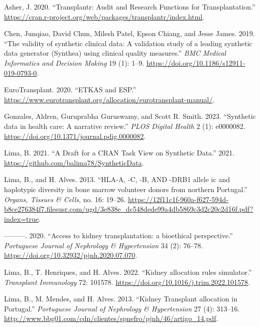 \documentclass[
]{article}
\newlength{\cslhangindent}
\newlength{\cslentryspacingunit} %
\newenvironment{CSLReferences}[2] %
 {%
  \setlength{\parindent}{0pt}
  \ifodd #1
  \let\oldpar\par
  \def\par{\hangindent=\cslhangindent\oldpar}
  \fi
  \setlength{\parskip}{#2\cslentryspacingunit}
 }%
 {}
\begin{document}
\hypertarget{refs}{}
\begin{CSLReferences}{1}{0}
\leavevmode{}%
Asher, J. 2020. {``Transplantr: Audit and Research Functions for
Transplantation.''}
\url{https://cran.r-project.org/web/packages/transplantr/index.html}.

\leavevmode{}%
Chen, Junqiao, David Chun, Milesh Patel, Epson Chiang, and Jesse James.
2019. {``{The validity of synthetic clinical data: A validation study of
a leading synthetic data generator (Synthea) using clinical quality
measures}.''} \emph{BMC Medical Informatics and Decision Making} 19 (1):
1--9. \url{https://doi.org/10.1186/s12911-019-0793-0}.

\leavevmode{}%
EuroTransplant. 2020. {``{ETKAS and ESP}.''}
\url{https://www.eurotransplant.org/allocation/eurotransplant-manual/}.

\leavevmode{}%
Gonzales, Aldren, Guruprabha Guruswamy, and Scott R. Smith. 2023.
{``{Synthetic data in health care: A narrative review}.''} \emph{PLOS
Digital Health} 2 (1): e0000082.
\url{https://doi.org/10.1371/journal.pdig.0000082}.

\leavevmode{}%
Lima, B. 2021. {``A Draft for a CRAN Task View on Synthetic Data.''}
2021. \url{https://github.com/balima78/SyntheticData}.

\leavevmode{}%
Lima, B., and H. Alves. 2013. {``{HLA-A, -C, -B, AND -DRB1 allele ic and
haplotypic diversity in bone marrow volunteer donors from northern
Portugal}.''} \emph{Organs, Tissues \& Cells}, no. 16: 19--26.
\url{https://12f11c1f-960a-f627-594d-b8ce276384f7.filesusr.com/ugd/3e838e_dc548dede99a4db5869c3d2c20c2d16f.pdf?index=true}.

\leavevmode{}%
---------. 2020. {``{Access to kidney transplantation: a bioethical
perspective}.''} \emph{Portuguese Journal of Nephrology \& Hypertension}
34 (2): 76--78. \url{https://doi.org/10.32932/pjnh.2020.07.070}.

\leavevmode{}%
Lima, B., T. Henriques, and H. Alves. 2022. {``{Kidney allocation rules
simulator}.''} \emph{Transplant Immunology} 72: 101578.
\url{https://doi.org/10.1016/j.trim.2022.101578}.

\leavevmode{}%
Lima, B., M. Mendes, and H. Alves. 2013. {``{Kidney Transplant
allocation in Portugal}.''} \emph{Portuguese Journal of Nephrology \&
Hypertension} 27 (4): 313--16.
\url{http://www.bbg01.com/cdn/clientes/spnefro/pjnh/46/artigo_14.pdf}.


\end{CSLReferences}
\end{document}
